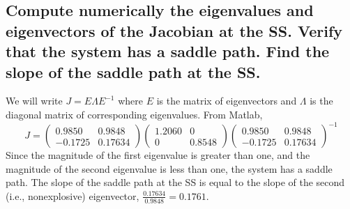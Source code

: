 \documentclass[11pt]{article} %
\begin{document}
\subsection{Compute numerically the eigenvalues and eigenvectors of the Jacobian at the SS. Verify that the system has a saddle path. Find the slope of the saddle path at the SS.}
We will write $J = E\Lambda E^{-1}$ where $E$ is the matrix of eigenvectors and $\Lambda$ is the diagonal matrix of corresponding eigenvalues. From Matlab,
\begin{equation*}
 J = \begin{pmatrix} 0.9850 & 0.9848 \\ -0.1725 & 0.17634 \end{pmatrix}  \begin{pmatrix} 1.2060 & 0 \\ 0 & 0.8548 \end{pmatrix}  \begin{pmatrix} 0.9850 & 0.9848 \\ -0.1725 & 0.17634 \end{pmatrix}^{-1}
\end{equation*}
Since the magnitude of the first eigenvalue is greater than one, and the magnitude of the second eigenvalue is less than one, the system has a saddle path. The slope of the saddle path at the SS is equal to the slope of the second (i.e., nonexplosive) eigenvector, $\frac{0.17634}{0.9848} = 0.1761.$
\end{document}
